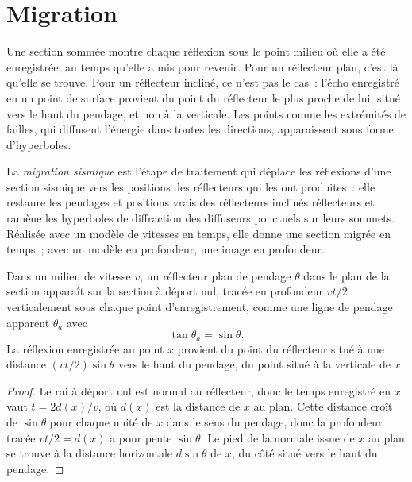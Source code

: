 \section{Migration}

Une section sommée montre chaque réflexion sous le point milieu où elle a été
enregistrée, au temps qu'elle a mis pour revenir. Pour un réflecteur plan, c'est
là qu'elle se trouve. Pour un réflecteur incliné, ce n'est pas le cas~: l'écho enregistré en un point de surface
provient du point du réflecteur le plus proche de lui, situé vers le haut du pendage, et non
à la verticale. Les points comme les extrémités de failles, qui diffusent l'énergie dans toutes les
directions, apparaissent sous forme d'hyperboles.

\begin{definition}\label{def:b3:exploration-seismology:migration}
La \emph{migration sismique} est l'étape de traitement qui
déplace les réflexions d'une section sismique vers les positions des réflecteurs
qui les ont produites~: elle restaure les pendages et positions vrais des réflecteurs inclinés
réflecteurs et ramène les hyperboles de diffraction des diffuseurs ponctuels sur
leurs sommets. Réalisée avec un modèle de vitesses en temps, elle donne une
section migrée en temps~; avec un modèle en profondeur, une image en profondeur.
\end{definition}

\begin{theorem}\label{thm:b3:exploration-seismology:dip}
Dans un milieu de vitesse $v$, un réflecteur plan de pendage $\theta$ dans le plan de la
section apparaît sur la section à déport nul, tracée en profondeur $vt/2$
verticalement sous chaque point d'enregistrement, comme une ligne de pendage apparent $\theta_a$
avec
\[
  \tan\theta_a = \sin\theta .
\]
La réflexion enregistrée au point $x$ provient du point du réflecteur situé à
une distance $(vt/2)\sin\theta$ vers le haut du pendage, du point situé à la verticale de $x$.
\end{theorem}

\begin{proof}
Le rai à déport nul est normal au réflecteur, donc le temps enregistré en $x$ vaut
$t = 2d(x)/v$, où $d(x)$ est la distance de $x$ au plan. Cette distance
croît de $\sin\theta$ pour chaque unité de $x$ dans le sens du pendage, donc la profondeur tracée
$vt/2 = d(x)$ a pour pente $\sin\theta$. Le pied de la normale issue de $x$
au plan se trouve à la distance horizontale $d\sin\theta$ de $x$, du côté
situé vers le haut du pendage.
\end{proof}

